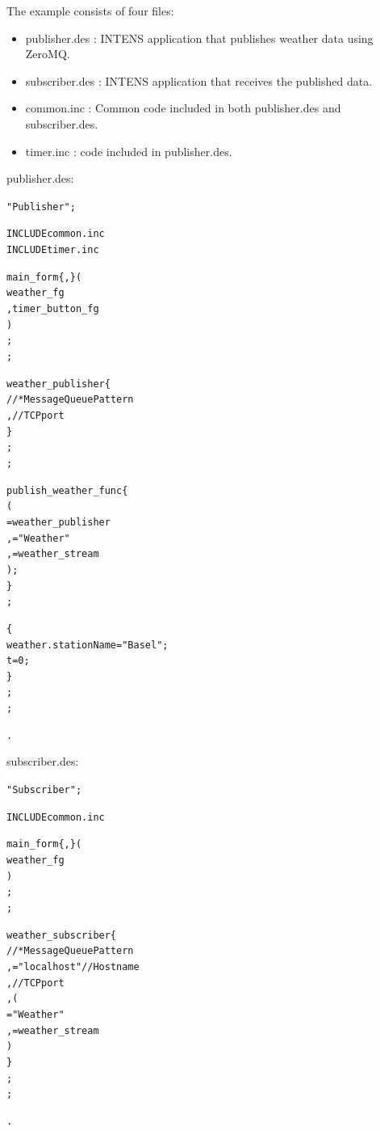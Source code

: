 The example consists of four files:
\begin{itemize}
\item publisher.des  : INTENS application that publishes weather data using ZeroMQ.
\item subscriber.des : INTENS application that receives the published data.
\item common.inc     : Common code included in both publisher.des and subscriber.des.
\item timer.inc      : \TIMER{} code included in publisher.des.
\end{itemize}

\newpage
publisher.des:

\begin{boxedminipage}[t]{\linewidth}
\begin{alltt}
\DESCRIPTION "Publisher";

INCLUDE common.inc
INCLUDE timer.inc

\UIMANAGER
  \FORM
    main_form \{ \MAIN, \HIDECYCLE \} (
      weather_fg
    , timer_button_fg
    )
  ;
\END \UIMANAGER;

\OPERATOR
  \MESSAGEQUEUE
    weather_publisher \{
      \PUBLISH              // *MessageQueue Pattern
    ,             // TCP port
    \}
  ;
\END \OPERATOR;

\FUNCTIONS
  \FUNC
    publish_weather_func \{
      \PUBLISH (
        \MESSAGEQUEUE = weather_publisher
      , \HEADER="Weather"
      , \RESPONSE=weather_stream
      );
    \}
  ;

  \FUNC
    \INIT \{
      weather.stationName = "Basel";
      t = 0;
    \}
  ;
\END \FUNCTIONS;

\END.
\end{alltt}
\end{boxedminipage}


\newpage
subscriber.des:

\begin{boxedminipage}[t]{\linewidth}
\begin{alltt}
\DESCRIPTION "Subscriber";

INCLUDE common.inc

\UIMANAGER
  \FORM
    main_form \{ \MAIN, \HIDECYCLE \} (
      weather_fg
    )
  ;
\END \UIMANAGER;

\OPERATOR
  \MESSAGEQUEUE
    weather_subscriber \{
      \SUBSCRIBE            // *MessageQueue Pattern
    , \HOST="localhost"     // Hostname
    ,             // TCP port
    , (
        \HEADER="Weather"
      , \STREAM=weather_stream
      )
    \}
  ;
\END \OPERATOR;

\END.
\end{alltt}
\end{boxedminipage}


